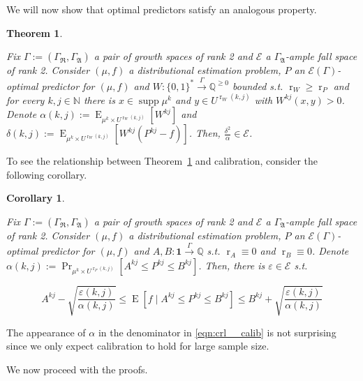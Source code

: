 \documentclass{article}
\theoremstyle{definition}
\theoremstyle{plain}
\newtheorem{theorem}{Theorem}[section]
\newtheorem{corollary}{Corollary}[section]
\newcommand{\Words}{{\{ 0, 1 \}^*}}
\DeclareMathOperator{\Supp}{supp}
\DeclareMathOperator{\Prb}{Pr}
\DeclareMathOperator{\E}{E}
\DeclareMathOperator{\R}{r}
\newcommand{\Nats}{\mathbb{N}}
\newcommand{\Rats}{\mathbb{Q}}
\begin{document}
We will now show that optimal predictors satisfy an analogous property.

\begin{theorem}
\label{thm:calib}

Fix $\Gamma:=(\Gamma_{\mathfrak{R}},\Gamma_{\mathfrak{A}})$ a pair of growth spaces of rank 2 and $\mathcal{E}$ a $\Gamma_{\mathfrak{A}}$-ample fall space of rank 2. Consider $(\mu,f)$ a distributional estimation problem, $P$ an $\mathcal{E}(\Gamma)$-optimal predictor for $(\mu,f)$ and ${W: \Words \xrightarrow{\Gamma} \Rats^{\geq 0}}$ bounded s.t. $\R_W \geq \R_P$ and for every $k,j \in \Nats$ there is $x \in \Supp \mu^k$ and $y \in U^{\R_W(k,j)}$ with $W^{kj}(x,y) > 0$. Denote ${\alpha(k,j):=\E_{\mu^k \times U^{\R_W(k,j)}}[W^{kj}]}$ and ${\delta(k,j):=\E_{\mu^k \times U^{\R_W(k,j)}}[W^{kj}(P^{kj}-f)]}$. Then, $\frac{\delta^2}{\alpha} \in \mathcal{E}$.

\end{theorem}

To see the relationship between Theorem~\ref{thm:calib} and calibration, consider the following corollary.

\begin{corollary}
\label{crl:calib}

Fix $\Gamma:=(\Gamma_{\mathfrak{R}},\Gamma_{\mathfrak{A}})$ a pair of growth spaces of rank 2 and $\mathcal{E}$ a $\Gamma_{\mathfrak{A}}$-ample fall space of rank 2. Consider $(\mu,f)$ a distributional estimation problem, $P$ an $\mathcal{E}(\Gamma)$-optimal predictor for $(\mu,f)$ and $A,B: \bm{1} \xrightarrow{\Gamma} \Rats$ s.t. $\R_A \equiv 0$ and $\R_B \equiv 0$. Denote ${\alpha(k,j):=\Prb_{\mu^k \times U^{\R_P(k,j)}}[A^{kj} \leq P^{kj} \leq B^{kj}]}$. Then, there is $\varepsilon \in \mathcal{E}$ s.t. 

\begin{equation}
\label{eqn:crl__calib}
A^{kj} - \sqrt{\frac{\varepsilon(k,j)}{\alpha(k,j)}} \leq \E[f \mid A^{kj} \leq P^{kj} \leq B^{kj}] \leq B^{kj} + \sqrt{\frac{\varepsilon(k,j)}{\alpha(k,j)}}
\end{equation}

\end{corollary}

The appearance of $\alpha$ in the denominator in \ref{eqn:crl__calib} is not surprising since we only expect calibration to hold for large sample size.

We now proceed with the proofs.
\end{document}

